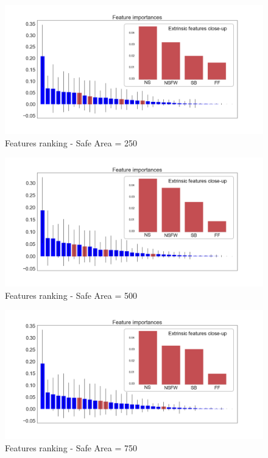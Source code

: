 \begin{figure}[t!]
	\includegraphics[width=\columnwidth]{chapter4/figure/features_importances_250.png}
	\caption{Features ranking - Safe Area = 250}
	\label{fig:250_overall}
\end{figure}
\begin{figure}[t!]
	\includegraphics[width=\columnwidth]{chapter4/figure/features_importances_500.png}
	\caption{Features ranking - Safe Area = 500}
	\label{fig:500_overall}
\end{figure}
\begin{figure}[t!]
	\includegraphics[width=\columnwidth]{chapter4/figure/features_importances_750.png}
	\caption{Features ranking - Safe Area = 750}
	\label{fig:750_overall}
\end{figure}

